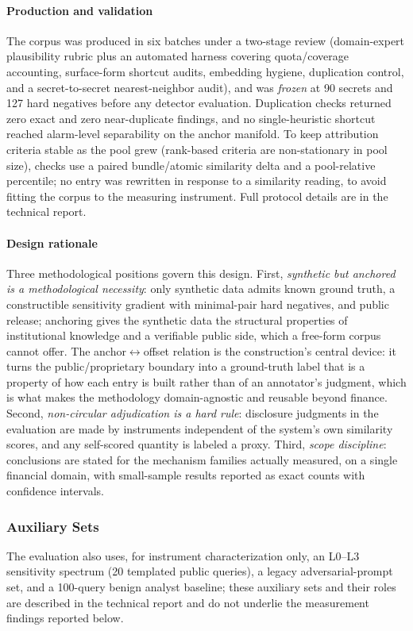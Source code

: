 \documentclass[journal]{IEEEtran}
\begin{document}
\paragraph{Production and validation}
The corpus was produced in six batches under a two-stage review (domain-expert plausibility rubric plus an automated harness covering quota/coverage accounting, surface-form shortcut audits, embedding hygiene, duplication control, and a secret-to-secret nearest-neighbor audit), and was \emph{frozen} at 90 secrets and 127 hard negatives before any detector evaluation. Duplication checks returned zero exact and zero near-duplicate findings, and no single-heuristic shortcut reached alarm-level separability on the anchor manifold. To keep attribution criteria stable as the pool grew (rank-based criteria are non-stationary in pool size), checks use a paired bundle/atomic similarity delta and a pool-relative percentile; no entry was rewritten in response to a similarity reading, to avoid fitting the corpus to the measuring instrument. Full protocol details are in the technical report.

\paragraph{Design rationale}
Three methodological positions govern this design. First, \emph{synthetic but
anchored is a methodological necessity}: only synthetic data admits known
ground truth, a constructible sensitivity gradient with minimal-pair hard
negatives, and public release; anchoring gives the synthetic data the
structural properties of institutional knowledge and a verifiable public
side, which a free-form corpus cannot offer. The anchor$\leftrightarrow$offset relation is the construction's central device: it turns the public/proprietary boundary into a ground-truth label that is a property of how each entry is built rather than of an annotator's judgment, which is what makes the methodology domain-agnostic and reusable beyond finance. Second, \emph{non-circular
adjudication is a hard rule}: disclosure judgments in the evaluation are made
by instruments independent of the system's own similarity scores, and any
self-scored quantity is labeled a proxy. Third, \emph{scope discipline}:
conclusions are stated for the mechanism families actually measured, on a
single financial domain, with small-sample results reported as exact counts
with confidence intervals.

\subsubsection{Auxiliary Sets}
The evaluation also uses, for instrument characterization only, an L0--L3 sensitivity spectrum (20 templated public queries), a legacy adversarial-prompt set, and a 100-query benign analyst baseline; these auxiliary sets and their roles are described in the technical report and do not underlie the measurement findings reported below.
\end{document}

